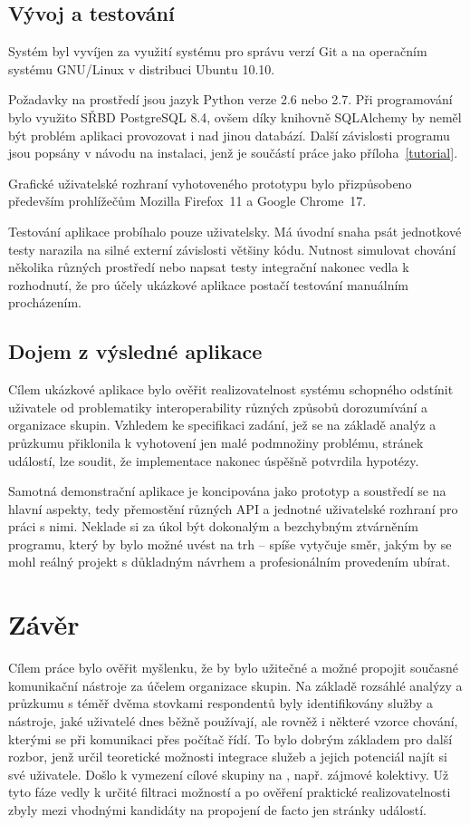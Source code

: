 \documentclass[12pt,oneside,final]{fithesis2}
\begin{document}
\section{Vývoj a testování}
Systém byl vyvíjen za využití systému pro správu verzí Git a na operačním systému GNU/Linux v distribuci Ubuntu 10.10.

Požadavky na prostředí jsou jazyk Python verze 2.6 nebo 2.7. Při programování bylo využito SŘBD PostgreSQL 8.4, ovšem díky knihovně SQLAlchemy by neměl být problém aplikaci provozovat i nad jinou databází. Další závislosti programu jsou popsány v návodu na instalaci, jenž je součástí práce jako příloha~\ref{tutorial}.

Grafické uživatelské rozhraní vyhotoveného prototypu bylo přizpůsobeno především prohlížečům Mozilla Firefox~11 a Google Chrome~17.

Testování aplikace probíhalo pouze uživatelsky. Má úvodní snaha psát jednotkové testy narazila na silné externí závislosti většiny kódu. Nutnost simulovat chování několika různých prostředí nebo napsat testy integrační nakonec vedla k rozhodnutí, že pro účely ukázkové aplikace postačí testování manuálním procházením.



\section{Dojem z výsledné aplikace}
Cílem ukázkové aplikace bylo ověřit realizovatelnost systému schopného odstínit uživatele od problematiky interoperability různých způsobů dorozumívání a organizace skupin. Vzhledem ke specifikaci zadání, jež se na základě analýz a průzkumu přiklonila k vyhotovení jen malé podmnožiny problému, stránek událostí, lze soudit, že implementace nakonec úspěšně potvrdila hypotézy.

Samotná demonstrační aplikace je koncipována jako prototyp a soustředí se na hlavní aspekty, tedy přemostění různých API a jednotné uživatelské rozhraní pro práci s nimi. Neklade si za úkol být dokonalým a bezchybným ztvárněním programu, který by bylo možné uvést na trh -- spíše vytyčuje směr, jakým by se mohl reálný projekt s důkladným návrhem a profesionálním provedením ubírat.



\chapter{Závěr}
Cílem práce bylo ověřit myšlenku, že by bylo užitečné a možné propojit současné komunikační nástroje za účelem organizace skupin. Na základě rozsáhlé analýzy a průzkumu s téměř dvěma stovkami respondentů byly identifikovány služby a nástroje, jaké uživatelé dnes běžně používají, ale rovněž i některé vzorce chování, kterými se při komunikaci přes počítač řídí. To bylo dobrým základem pro další rozbor, jenž určil teoretické možnosti integrace služeb a jejich potenciál najít si své uživatele. Došlo k vymezení cílové skupiny na , např. zájmové kolektivy. Už tyto fáze vedly k určité filtraci možností a po ověření praktické realizovatelnosti zbyly mezi vhodnými kandidáty na propojení de facto jen stránky událostí.
\end{document}
